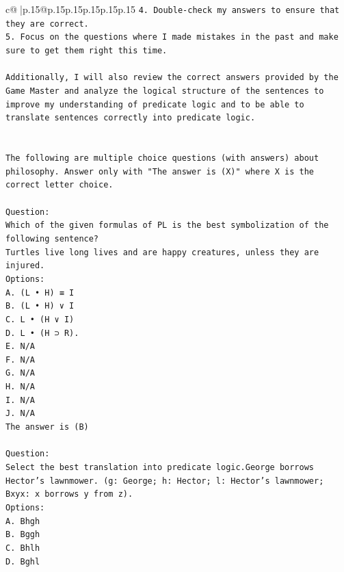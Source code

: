 \documentclass{article}
\begin{document}
{\begin{supertabular}{c@{$\;$}|p{.15\linewidth}@{}p{.15\linewidth}p{.15\linewidth}p{.15\linewidth}p{.15\linewidth}p{.15\linewidth}}
{{{\texttt{4. Double{-}check my answers to ensure that they are correct.} \\
\texttt{5. Focus on the questions where I made mistakes in the past and make sure to get them right this time.} \\
\\ 
\texttt{Additionally, I will also review the correct answers provided by the Game Master and analyze the logical structure of the sentences to improve my understanding of predicate logic and to be able to translate sentences correctly into predicate logic.} \\
\\ 
\\ 
\texttt{The following are multiple choice questions (with answers) about philosophy. Answer only with "The answer is (X)" where X is the correct letter choice.} \\
\\ 
\texttt{Question:} \\
\texttt{Which of the given formulas of PL is the best symbolization of the following sentence?} \\
\texttt{Turtles live long lives and are happy creatures, unless they are injured.} \\
\texttt{Options:} \\
\texttt{A. (L • H) ≡ I} \\
\texttt{B. (L • H) ∨ I} \\
\texttt{C. L • (H ∨ I)} \\
\texttt{D. L • (H ⊃ R).} \\
\texttt{E. N/A} \\
\texttt{F. N/A} \\
\texttt{G. N/A} \\
\texttt{H. N/A} \\
\texttt{I. N/A} \\
\texttt{J. N/A} \\
\texttt{The answer is (B)} \\
\\ 
\texttt{Question:} \\
\texttt{Select the best translation into predicate logic.George borrows Hector's lawnmower. (g: George; h: Hector; l: Hector's lawnmower; Bxyx: x borrows y from z).} \\
\texttt{Options:} \\
\texttt{A. Bhgh} \\
\texttt{B. Bggh} \\
\texttt{C. Bhlh} \\
\texttt{D. Bghl} \\
}}}
\end{supertabular}}
\end{document}
